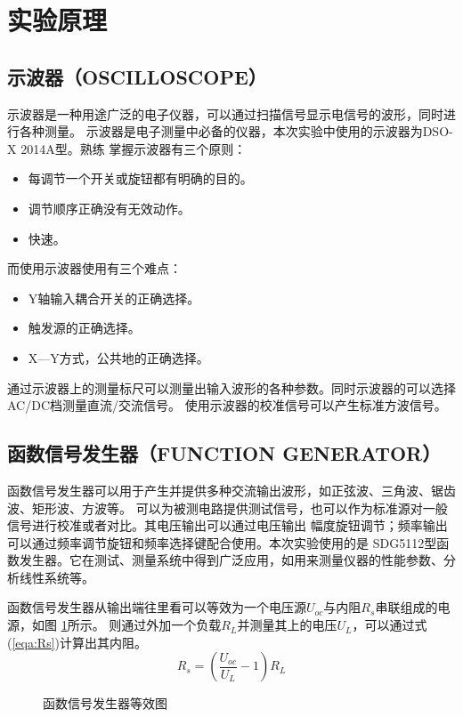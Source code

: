 \documentclass[a4paper,11pt,UTF8]{ctexart}
\begin{document}
\section{实验原理}
\subsection{示波器（OSCILLOSCOPE）}
示波器是一种用途广泛的电子仪器，可以通过扫描信号显示电信号的波形，同时进行各种测量。
示波器是电子测量中必备的仪器，本次实验中使用的示波器为DSO-X 2014A型。熟练 
掌握示波器有三个原则：
\begin{itemize}
  \item 每调节一个开关或旋钮都有明确的目的。
  \item 调节顺序正确没有无效动作。
  \item 快速。
\end{itemize}
而使用示波器使用有三个难点：
\begin{itemize}
  \item Y轴输入耦合开关的正确选择。
  \item 触发源的正确选择。
  \item X—Y方式，公共地的正确选择。
\end{itemize}

通过示波器上的测量标尺可以测量出输入波形的各种参数。同时示波器的可以选择AC/DC档测量直流/交流信号。
使用示波器的校准信号可以产生标准方波信号。

\subsection{函数信号发生器（FUNCTION GENERATOR）}
函数信号发生器可以用于产生并提供多种交流输出波形，如正弦波、三角波、锯齿波、矩形波、方波等。
可以为被测电路提供测试信号，也可以作为标准源对一般信号进行校准或者对比。其电压输出可以通过电压输出
幅度旋钮调节；频率输出可以通过频率调节旋钮和频率选择键配合使用。本次实验使用的是
SDG5112型函数发生器。它在测试、测量系统中得到广泛应用，如用来测量仪器的性能参数、分析线性系统等。

函数信号发生器从输出端往里看可以等效为一个电压源$U_{oc}$与内阻$R_s$串联组成的电源，如图 \ref{fig:FunR}所示。
则通过外加一个负载$R_L$并测量其上的电压$U_L$，可以通过式 (\ref{eqa:Rs})计算出其内阻。
\begin{equation}
R_s=\left(\frac{U_{oc}}{U_L}-1\right)R_L
\label{eqa:Rs}
\end{equation}

\begin{figure}[htbp]
\centering
{}
\caption{函数信号发生器等效图}
\label{fig:FunR}
\end{figure}
\end{document}
